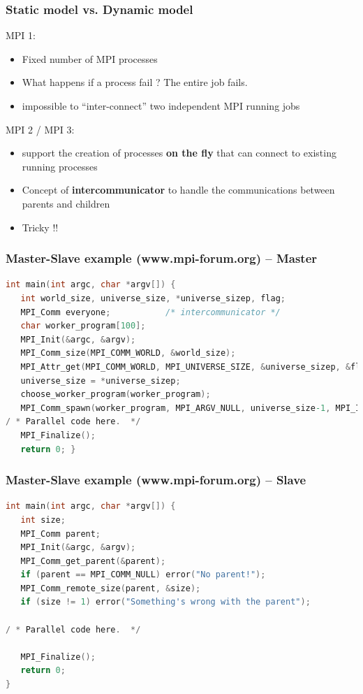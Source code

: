 \begin{frame}[containsverbatim]
\frametitle{Static model vs. Dynamic model}
MPI 1:
\begin{itemize}
	\item {Fixed number of MPI processes}
	\item {What happens if a process fail ? The entire job fails.}
	\item {impossible to ``inter-connect'' two independent MPI running jobs}
\end{itemize}
MPI 2 / MPI 3:
\begin{itemize}
	\item {support the creation of processes \textbf{on the fly} that can connect to existing running processes}
	\item {Concept of \textbf{intercommunicator} to handle the communications between parents and children}
	\item {Tricky !!}
\end{itemize}
\end{frame}


\begin{frame}[containsverbatim]
\frametitle{Master-Slave example (www.mpi-forum.org) -- Master}
\begin{lstlisting}[language=C,frame=lines]
int main(int argc, char *argv[]) { 
   int world_size, universe_size, *universe_sizep, flag; 
   MPI_Comm everyone;           /* intercommunicator */ 
   char worker_program[100]; 
   MPI_Init(&argc, &argv); 
   MPI_Comm_size(MPI_COMM_WORLD, &world_size); 
   MPI_Attr_get(MPI_COMM_WORLD, MPI_UNIVERSE_SIZE, &universe_sizep, &flag);  
   universe_size = *universe_sizep; 
   choose_worker_program(worker_program); 
   MPI_Comm_spawn(worker_program, MPI_ARGV_NULL, universe_size-1, MPI_INFO_NULL, 0, MPI_COMM_SELF, &everyone, MPI_ERRCODES_IGNORE); 
/ * Parallel code here.  */
   MPI_Finalize(); 
   return 0; }
\end{lstlisting}
\end{frame}


\begin{frame}[containsverbatim]
\frametitle{Master-Slave example (www.mpi-forum.org) -- Slave}
\begin{lstlisting}[language=C,frame=lines]
int main(int argc, char *argv[]) { 
   int size; 
   MPI_Comm parent; 
   MPI_Init(&argc, &argv); 
   MPI_Comm_get_parent(&parent); 
   if (parent == MPI_COMM_NULL) error("No parent!"); 
   MPI_Comm_remote_size(parent, &size); 
   if (size != 1) error("Something's wrong with the parent"); 
 
/ * Parallel code here.  */

   MPI_Finalize(); 
   return 0; 
} 
\end{lstlisting}
\end{frame}



